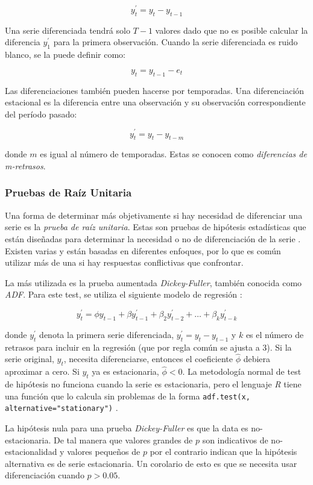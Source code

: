 \[ y_{t}^{\prime} = y_{t} - y_{t-1} \]

Una serie diferenciada tendrá solo $T-1$ valores dado que no es posible calcular la diferencia $y_{1}^{\prime}$ para la primera observación. Cuando la serie diferenciada es ruido blanco, se la puede definir como:

\[ y_{t} = y_{t-1} - e_{t} \]

Las diferenciaciones también pueden hacerse por temporadas. Una diferenciación estacional es la diferencia entre una observación y su observación correspondiente del período pasado:

\[ y_{t}^{\prime} = y_{t} - y_{t-m} \]

donde $m$ es igual al número de temporadas. Estas se conocen como \emph{diferencias de m-retrasos}.

\subsubsection{Pruebas de Raíz Unitaria}
Una forma de determinar más objetivamente si hay necesidad de diferenciar una serie es la \emph{prueba de raíz unitaria}. Estas son pruebas de hipótesis estadísticas que están diseñadas para determinar la necesidad o no de diferenciación de la serie \cite{hyndman}. Existen varias y están basadas en diferentes enfoques, por lo que es común utilizar más de una si hay respuestas conflictivas que confrontar.

La más utilizada es la prueba aumentada \emph{Dickey-Fuller}, también conocida como \emph{ADF}. Para este test, se utiliza el siguiente modelo de regresión \cite{dickeyfuller}:

\[ y_{t}^{\prime} = \phi y_{t-1} + \beta y_{t-1}^{\prime} + \beta_{2} y_{t-2}^{\prime} + \ldots + \beta_{k} y_{t-k}^{\prime} \]

donde $y_{t}^{\prime}$ denota la primera serie diferenciada, $y_{t}^{\prime} = y_{t} - y_{t-1}$ y $k$ es el número de retrasos para incluir en la regresión (que por regla común se ajusta a 3). Si la serie original, $y_{t}$, necesita diferenciarse, entonces el coeficiente $\hat{\phi}$ debiera aproximar a cero. Si $y_{t}$ ya es estacionaria, $\hat{\phi} < 0$. La metodología normal de test de hipótesis no funciona cuando la serie es estacionaria, pero el lenguaje \emph{R} tiene una función que lo calcula sin problemas de la forma \texttt{adf.test(x, alternative="stationary")} \cite{packageForecast}.

La hipótesis nula para una prueba \emph{Dickey-Fuller} es que la data es no-estacionaria. De tal manera que valores grandes de $p$ son indicativos de no-estacionalidad y valores pequeños de $p$ por el contrario indican que la hipótesis alternativa es de serie estacionaria. Un corolario de esto es que se necesita usar diferenciación cuando $p > 0.05$.

